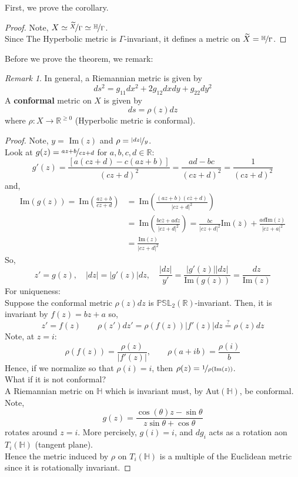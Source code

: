 \documentclass[a4paper, 11pt]{book}
\theoremstyle{definition}
\theoremstyle{remark}
\newtheorem*{remark}{Remark}
\begin{document}
    First, we prove the corollary.

    \begin{proof}
        Note, $X \simeq \nicefrac{\widetilde{X}}{\Gamma} \simeq \nicefrac{\mathbb{H}}{\Gamma}$.\\
        Since The Hyperbolic metric is $\Gamma$-invariant, it defines a metric on $\widetilde{X} = \nicefrac{\mathbb{H}}{\Gamma}$.
    \end{proof}

    Before we prove the theorem, we remark:
    \begin{remark}
        In general, a Riemannian metric is given by
        \[ ds^2 = g_{11}dx^2 + 2g_{12}dxdy + g_{22}dy^2 \]
        A \textbf{conformal} metric on $X$ is given by
        \[ ds = \rho(z)dz \]
        where $\rho: X\to\mathbb{R}^{\geq 0}$ (Hyperbolic metric is conformal).
    \end{remark}

    \begin{proof}
        Note, $y =$ Im$(z)$ and $\rho = \nicefrac{|dz|}{y}$.\\
        Look at $g(z) = \nicefrac{az+b}{cz+d}$ for $a,b,c,d\in\mathbb{R}$:
        \[ g'(z) = \frac{[a(cz+d)-c(az+b)]}{(cz+d)^2} = \frac{ad-bc}{(cz+d)^2} = \frac{1}{(cz+d)^2} \]
        and,
        \begin{align*}
            \text{Im}(g(z)) =\:\text{Im}(\frac{az+b}{cz+d}) &=\:\text{Im}(\frac{(az+b)(c\overline{z}+d)}{|cz+d|^2}) \\
            &=\:\text{Im}(\frac{bc\overline{z}+adz}{|cz+d|^2}) = \frac{bc}{|cz+d|^2}\text{Im}(\overline{z}) + 
                \frac{ad\text{Im}(z)}{|cz+a|^2} \\
            &= \frac{\text{Im}(z)}{|cz+d|^2}
        \end{align*}
        So,
        \[ z' = g(z),\quad |dz| = |g'(z)|dz,\quad \frac{|dz|}{y'} = \frac{|g'(z)||dz|}{\text{Im}(g(z))} = \frac{dz}{\text{Im}(z)} \]
        For uniqueness:\\
        Suppose the conformal metric $\rho(z)dz$ is $\mathbb{PSL}_2(\mathbb{R})$-invariant. Then, it is invariant by $f(z)=bz+a$
        so,
        \[ z' = f(z) \qquad \rho(z')dz' = \rho(f(z))|f'(z)|dz \stackrel{?}{=} \rho(z)dz \]
        Note, at $z=i$:
        \[ \rho(f(z)) = \frac{\rho(z)}{|f'(z)|},\qquad \rho(a+ib) = \frac{\rho(i)}{b} \]
        Hence, if we normalize so that $\rho(i) = i$, then $\rho(z) = \nicefrac{1}{\rho(\text{Im}(z))}$.\\

        What if it is not conformal?\\
        A Riemannian metric on $\mathbb{H}$ which is invariant must, by Aut$(\mathbb{H})$, be conformal. Note,
        \[ g(z) = \frac{\cos({\theta})z-\sin{\theta}}{z\sin{\theta}+\cos{\theta}} \]
        rotates around $z=i$. More percisely, $g(i) = i$, and $dg_i$ acts as a rotation aon $T_i(\mathbb{H})$ (tangent plane).\\
        Hence the metric induced by $\rho$ on $T_i(\mathbb{H})$ is a multiple of the Euclidean metric since it is rotationally invariant.
    \end{proof}
\end{document}
